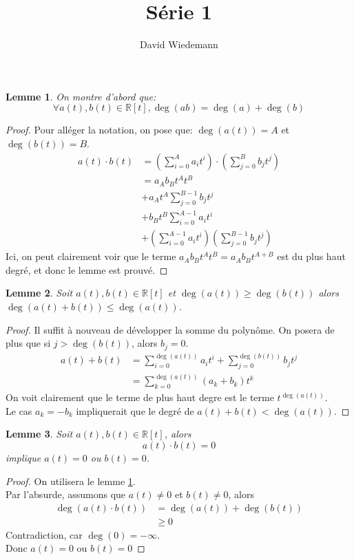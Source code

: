 \documentclass[11pt, a4paper, twoside]{article}
\newtheorem{lemma}{Lemme}
\begin{document}
\title{Série 1}
\author{David Wiedemann}
\maketitle
\begin{lemma}\label{degres}
On montre d'abord que:
\[ 
	\forall a(t) , b(t) \in \mathbb{R}[t], \deg (ab) = \deg(a) + \deg(b)
\]

\end{lemma}
\begin{proof}
Pour alléger la notation, on pose que: $\deg(a(t)) = A$ et $\deg(b(t)) = B$.\\
\begin{align*}
	a(t) \cdot b(t) &= \left( \sum_{i=0}^{A}a_i t^{i}\right) \cdot \left( \sum_{j=0}^{B}b_j t^{j}\right)\\
			&= a_A b_B t^{A} t^{B}\\
			&+ a_A t^{A} \sum_{j=0}^{B-1} b_j t^{j}\\
			&+ b_B t^{B} \sum_{i=0}^{A-1}a_i t^{i}\\
			&+ \left( \sum_{i=0}^{A-1} a_i t^{i}\right) \left( \sum_{j=0}^{B-1}b_j t^{j}\right)
\end{align*}
Ici, on peut clairement voir que le terme $a_A b_B t^{A} t^{B} =a_A b_B t^{A+B} $ est du plus haut degré, et donc le lemme est prouvé.
\end{proof}
\begin{lemma}\label{somme}
	Soit $a(t), b(t) \in \mathbb{R}[t]$ et $\deg(a(t))\geq\deg(b(t))$ alors $\deg(a(t) + b(t)) \leq \deg (a(t))$.
\end{lemma}
\begin{proof}
Il suffit à nouveau de développer la somme du polynôme.
On posera de plus que si $j>\deg(b(t))$, alors $b_j=0$.
\begin{align*}
	a(t) + b(t) &= \sum_{i=0}^{\deg(a(t))} a_i t^{i} + \sum_{j=0}^{\deg(b(t))} b_j t^{j}\\
		    &= \sum_{k=0}^{\deg(a(t))} (a_k + b_k) t^{k}
\end{align*}
On voit clairement que le terme de plus haut degre est le terme $t^{\deg(a(t))}$.\\
Le cas $a_k = -b_k$ impliquerait que le degré de $a(t)+ b(t) < \deg(a(t))$.
\end{proof}
\begin{lemma}\label{produit}
	Soit $a(t), b(t) \in \mathbb{R}[t]$, alors 
	\[ 
		a(t) \cdot b(t) = 0
	\]
	implique $a(t)=0$ ou $b(t)=0$.
\end{lemma}
\begin{proof}
	On utilisera le lemme \ref{degres}.\\
	Par l'absurde, assumons que $a(t) \neq 0$ et $b(t)\neq 0$, alors
	\begin{align*}
		\deg(a(t)\cdot b(t)) &= \deg(a(t)) + \deg(b(t))\\
				 &\geq 0 
	\end{align*}
	Contradiction, car $\deg(0) = - \infty $.\\
	Donc $a(t)=0$ ou $b(t)=0$
	
\end{proof}
\end{document}
